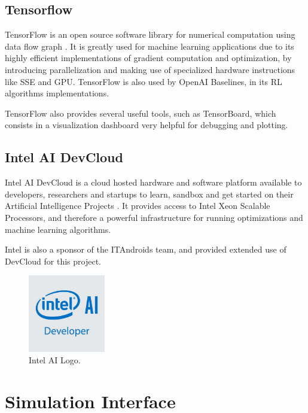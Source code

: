 \subsection{Tensorflow}

TensorFlow is an open source software library for numerical computation using data flow graph \cite{TensorFlow}. It is greatly used for machine learning applications due to its highly efficient implementations of gradient computation and optimization, by introducing parallelization and making use of specialized hardware instructions like SSE and GPU. TensorFlow is also used by OpenAI Baselines, in its RL algorithms implementations.

TensorFlow also provides several useful tools, such as TensorBoard, which consists in a visualization dashboard very helpful for debugging and plotting.

\subsection{Intel AI DevCloud}

Intel AI DevCloud is a cloud hosted hardware and software platform available to developers, researchers and startups to learn, sandbox and get started on their Artificial Intelligence Projects \cite{devcloud}. It provides access to Intel Xeon Scalable Processors, and therefore a powerful infrastructure for running optimizations and machine learning algorithms.

Intel is also a sponsor of the ITAndroids team, and provided extended use of DevCloud for this project.

\begin{figure}[H]
    \centering
    \includegraphics[width=0.3\textwidth]{Chapter5/intelai_logo.jpg} 
    \caption{Intel AI Logo.}
    \label{fig:intelai_logo}
\end{figure}

\section{Simulation Interface}

